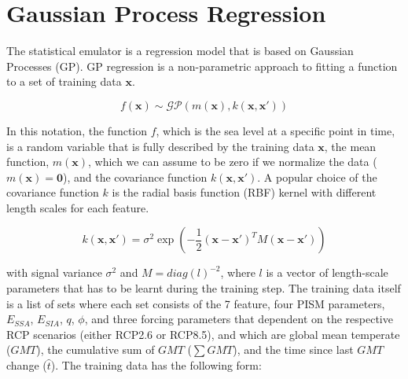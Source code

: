 \documentclass[12pt,a4paper]{article}
\begin{document}
\section{Gaussian Process Regression}

The statistical emulator is a regression model that is based on Gaussian Processes (GP).
GP regression is a non-parametric approach to fitting a function to a set of training data $\mathbf{x}$.

\begin{equation}
f(\mathbf{x}) \sim \mathcal{GP} \left(m(\mathbf{x}), k(\mathbf{x},\mathbf{x'}) \right)
\end{equation}

In this notation, the function $f$, which is the sea level at a specific point in time, is a random variable that is fully described by the training data $\mathbf{x}$, the mean function, $m(\mathbf{x})$, which we can assume to be zero if we normalize the data ($m(\mathbf{x})=\textbf{0}$), and the covariance function $k(\mathbf{x},\mathbf{x'})$.
A popular choice of the covariance function $k$ is the radial basis function (RBF) kernel with different length scales for each feature.

\begin{equation}
k(\mathbf{x}, \mathbf{x}') = \sigma^2 \exp\left(-\frac{1}{2}(\mathbf{x}-\mathbf{x'})^T M (\mathbf{x}-\mathbf{x'})\right)
\end{equation}

with signal variance $\sigma^2$ and $M=diag(l)^{-2}$, where $l$ is a vector of length-scale parameters that has to be learnt during the training step.
The training data itself is a list of sets where each set consists of the 7 feature, four PISM parameters, $E_{SSA}$, $E_{SIA}$, $q$, $\phi$, and three forcing parameters that dependent on the respective RCP scenarios (either RCP2.6 or RCP8.5), and which are global mean temperate ($GMT$), the cumulative sum of $GMT$ ($\sum GMT$), and the time since last $GMT$ change ($\hat{t}$).
The training data has the following form:
\end{document}
